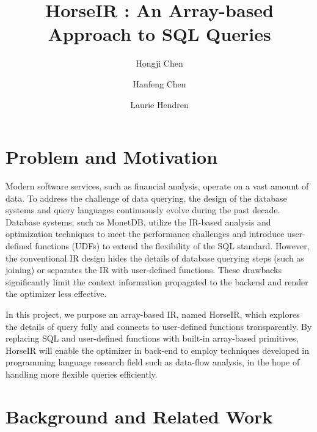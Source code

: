 \documentclass[sigplan]{acmart}
\begin{document}
\title{HorseIR : An Array-based Approach to SQL Queries}

\author{Hongji Chen}

\author{Hanfeng Chen}

\author{Laurie Hendren}

\maketitle

\section{Problem and Motivation}

Modern software services, such as financial analysis, operate on a vast amount
of data. To address the challenge of data querying, the design of the database
systems and query languages continuously evolve during the past decade.
Database systems, such as MonetDB\cite{MonetDBHome}, utilize the
IR-based analysis and optimization techniques to meet the performance
challenges and introduce user-defined functions (UDFs) to extend the
flexibility of the SQL standard.  However, the conventional IR design hides the
details of database querying steps (such as joining) or separates the IR with
user-defined functions. These drawbacks significantly limit the context
information propagated to the backend and render the optimizer less effective. 

In this project, we purpose an array-based IR, named HorseIR, which explores the
details of query fully and connects to user-defined functions transparently. By
replacing SQL and user-defined functions with built-in array-based primitives, HorseIR will
enable the optimizer in back-end to employ techniques developed in programming language
research field such as data-flow analysis, in the hope of handling more
flexible queries efficiently. 

\section{Background and Related Work}
\end{document}
